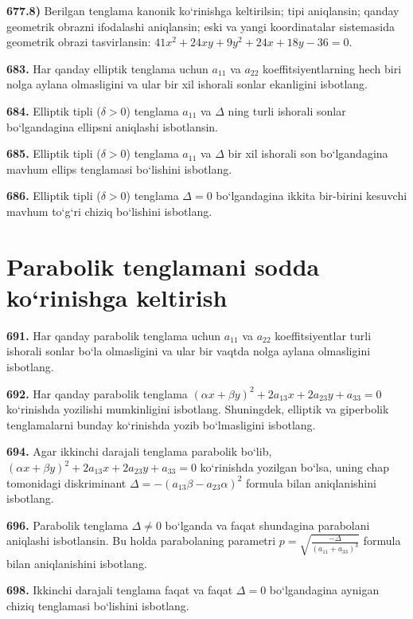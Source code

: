 \textbf{677.8)} Berilgan tenglama kanonik ko‘rinishga keltirilsin; tipi aniqlansin; qanday geometrik obrazni ifodalashi aniqlansin; eski va yangi koordinatalar sistemasida geometrik obrazi tasvirlansin: $41 x^2+24 x y+9 y^2+24 x+18 y-36=0$.

\textbf{683.} Har qanday elliptik tenglama uchun $a_{11}$ va $a_{22}$ koeffitsiyentlarning hech biri nolga aylana olmasligini va ular bir xil ishorali sonlar ekanligini isbotlang.

\textbf{684.} Elliptik tipli ($\delta>0$) tenglama $a_{11}$ va $\Delta$ ning turli ishorali sonlar bo‘lgandagina ellipsni aniqlashi isbotlansin.

\textbf{685.} Elliptik tipli ($\delta>0$) tenglama $a_{11}$ va $\Delta$ bir xil ishorali son bo‘lgandagina mavhum ellips tenglamasi bo‘lishini isbotlang.

\textbf{686.} Elliptik tipli ($\delta>0$) tenglama $\Delta=0$ bo‘lgandagina ikkita bir-birini kesuvchi mavhum to‘g‘ri chiziq bo‘lishini isbotlang.


\section{Parabolik tenglamani sodda ko‘rinishga keltirish}



\textbf{691.} Har qanday parabolik tenglama uchun $a_{11}$ va $a_{22}$ koeffitsiyentlar turli ishorali sonlar bo‘la olmasligini va ular bir vaqtda nolga aylana olmasligini isbotlang.

\textbf{692.} Har qanday parabolik tenglama $ (\alpha x+\beta y) ^2+2a_{13}x+2a_{23}y+a_{33}=0$ ko‘rinishda yozilishi mumkinligini isbotlang. Shuningdek, elliptik va giperbolik tenglamalarni bunday ko‘rinishda yozib bo‘lmasligini isbotlang.

\textbf{694.} Agar ikkinchi darajali tenglama parabolik bo‘lib, $ (\alpha x+\beta y) ^2+2a_{13}x+2a_{23}y+a_{33}=0$ ko‘rinishda yozilgan bo‘lsa, uning chap tomonidagi diskriminant $\Delta=- (a_{13} \beta-a_{23} \alpha) ^2$ formula bilan aniqlanishini isbotlang.

\textbf{696.} Parabolik tenglama $\Delta \neq 0$ bo‘lganda va faqat shundagina parabolani aniqlashi isbotlansin. Bu holda parabolaning parametri $p=\sqrt{\frac{-\Delta}{ (a_{11}+a_{33}) ^3}}$ formula bilan aniqlanishini isbotlang.

\textbf{698.} Ikkinchi darajali tenglama faqat va faqat $\Delta=0$ bo‘lgandagina aynigan chiziq tenglamasi bo‘lishini isbotlang.




